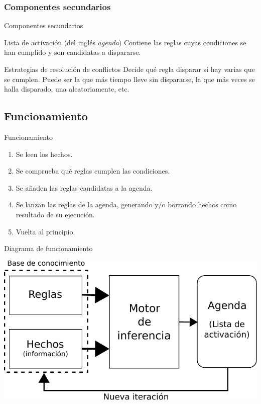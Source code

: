\documentclass[smaller,spanish,xcolor=svgnames]{beamer}
\begin{document}
\subsubsection{Componentes secundarios}

\begin{frame}{Componentes secundarios}
  \begin{block}{Lista de activación (del inglés \textit{agenda})}
    Contiene las reglas cuyas condiciones se han cumplido y son candidatas a
    dispararse.
  \end{block}

  \begin{block}{Estrategias de resolución de conflictos}
    Decide qué regla disparar si hay varias que se cumplen. Puede ser la que más tiempo lleve sin dispararse, la que más veces se halla disparado, una aleatoriamente, etc.
  \end{block}  
\end{frame}

\subsection{Funcionamiento}
\begin{frame}{Funcionamiento}
  \begin{enumerate}
  \item Se leen los hechos.
  \item Se comprueba qué reglas cumplen las condiciones.
  \item Se añaden las reglas candidatas a la agenda.
  \item Se lanzan las reglas de la agenda, generando y/o borrando hechos como resultado de su ejecución.
  \item Vuelta al principio.
  \end{enumerate}
\end{frame}

\begin{frame}{Diagrama de funcionamiento}
  \begin{center}
    \includegraphics[width=\textwidth]{img/diagrama_funcionamiento}
  \end{center}  
\end{frame}
\end{document}
